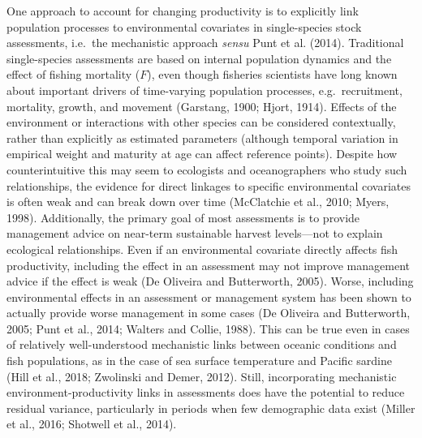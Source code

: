 \documentclass[]{article}
\begin{document}
One approach to account for changing productivity is to explicitly link
population processes to environmental covariates in single-species stock
assessments, i.e.~the mechanistic approach \emph{sensu} Punt et al.
(2014). Traditional single-species assessments are based on internal
population dynamics and the effect of fishing mortality (\(F\)), even
though fisheries scientists have long known about important drivers of
time-varying population processes, e.g.~recruitment, mortality, growth,
and movement (Garstang, 1900; Hjort, 1914). Effects of the environment
or interactions with other species can be considered contextually,
rather than explicitly as estimated parameters (although temporal
variation in empirical weight and maturity at age can affect reference
points). Despite how counterintuitive this may seem to ecologists and
oceanographers who study such relationships, the evidence for direct
linkages to specific environmental covariates is often weak and can
break down over time (McClatchie et al., 2010; Myers, 1998).
Additionally, the primary goal of most assessments is to provide
management advice on near-term sustainable harvest levels---not to
explain ecological relationships. Even if an environmental covariate
directly affects fish productivity, including the effect in an
assessment may not improve management advice if the effect is weak (De
Oliveira and Butterworth, 2005). Worse, including environmental effects
in an assessment or management system has been shown to actually provide
worse management in some cases (De Oliveira and Butterworth, 2005; Punt
et al., 2014; Walters and Collie, 1988). This can be true even in cases
of relatively well-understood mechanistic links between oceanic
conditions and fish populations, as in the case of sea surface
temperature and Pacific sardine (Hill et al., 2018; Zwolinski and Demer,
2012). Still, incorporating mechanistic environment-productivity links
in assessments does have the potential to reduce residual variance,
particularly in periods when few demographic data exist (Miller et al.,
2016; Shotwell et al., 2014).
\end{document}
